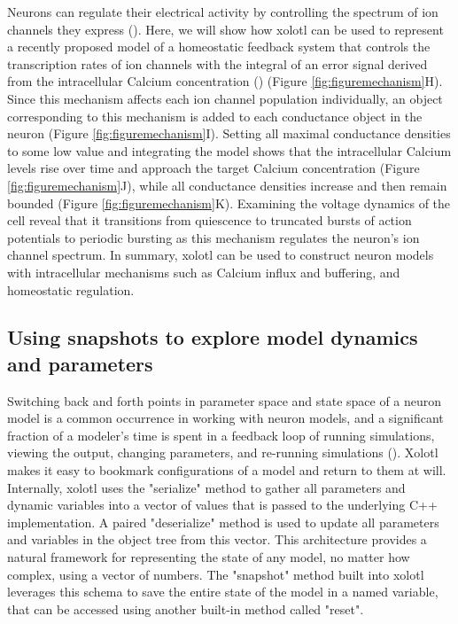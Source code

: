 \documentclass{frontiersSCNS} %
\begin{document}
Neurons can regulate their electrical activity by controlling the spectrum of ion channels they express (\cite{macleanActivityIndependentHomeostasisRhythmically2003, turrigianoSelectiveRegulationCurrent1995, schulzVariableChannelExpression2006}). Here, we will show how xolotl can be used to represent a recently proposed model of a homeostatic feedback system that controls the transcription rates of ion channels with the integral of an error signal derived from the intracellular Calcium concentration (\cite{olearyCorrelationsIonChannel2013, olearyCellTypesNetwork2014}) (Figure \ref{fig:figuremechanism}H). Since this mechanism affects each ion channel population individually, an object corresponding to this mechanism is added to each conductance object in the neuron (Figure \ref{fig:figuremechanism}I). Setting all maximal conductance densities to some low value and integrating the model shows that the intracellular Calcium levels rise over time and approach the target Calcium concentration (Figure \ref{fig:figuremechanism}J), while all conductance densities increase and then remain bounded (Figure \ref{fig:figuremechanism}K). Examining the voltage dynamics of the cell reveal that it transitions from quiescence to truncated bursts of action potentials to periodic bursting as this mechanism regulates the neuron's ion channel spectrum. In summary, xolotl can be used to construct neuron models with intracellular mechanisms such as Calcium influx and buffering, and homeostatic regulation.




%
%
%
%
%




\subsection{Using snapshots to explore model dynamics and parameters}

Switching back and forth points in parameter space and state space of a neuron model is a common occurrence in working with neuron models, and a significant fraction of a modeler's time is spent in a feedback loop of running simulations, viewing the output, changing parameters, and re-running simulations (\cite{deschutterConsumerGuideNeuronal1992}). Xolotl makes it easy to bookmark configurations of a model and return to them at will. Internally, xolotl uses the "serialize" method to gather all parameters and dynamic variables into a vector of values that is passed to the underlying C++ implementation. A paired "deserialize" method is used to update all parameters and variables in the object tree from this vector. This architecture provides a natural framework for representing the state of any model, no matter how complex, using a vector of numbers. The "snapshot" method built into xolotl leverages this schema to save the entire state of the model in a named variable, that can be accessed using another built-in method called "reset".
\end{document}
